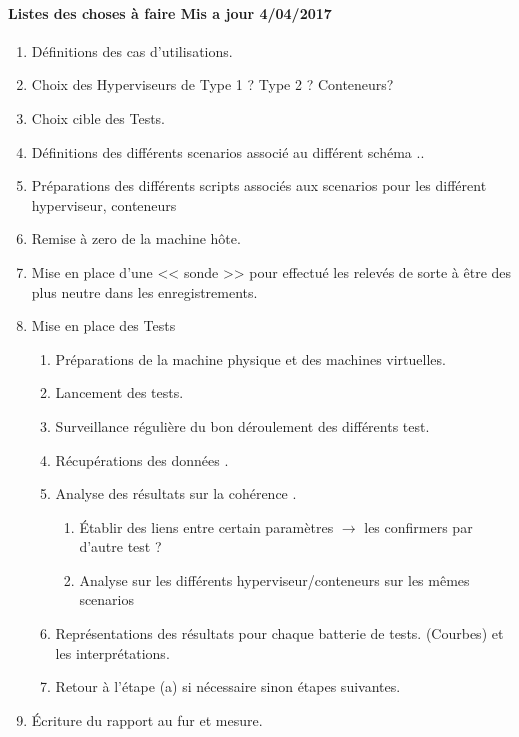 \documentclass[french]{article}
\begin{document}
\paragraph{Listes des choses à faire Mis a jour 4/04/2017}
\begin{enumerate}
	\item Définitions des cas d'utilisations. 
	\item Choix des Hyperviseurs de Type 1 ? Type 2 ? Conteneurs?
	\item Choix cible des Tests.
	\item Définitions des différents scenarios associé au différent schéma ..
	\item Préparations des différents scripts associés aux scenarios pour les différent hyperviseur, conteneurs 
	\item Remise à zero de la machine hôte.
	\item Mise en place d'une << sonde >> pour effectué les relevés de sorte à être des plus neutre dans les enregistrements.
	\item Mise en place des Tests 
		\begin{enumerate}
			\item Préparations de la machine physique et des machines virtuelles. 
			\item Lancement des tests.
			\item Surveillance régulière du bon déroulement des différents test.
			\item Récupérations des données . 
			\item Analyse des résultats sur la cohérence .
			\begin{enumerate}
				\item Établir des liens entre certain paramètres $\rightarrow $ les confirmers par d'autre test ? 
				\item Analyse sur les différents hyperviseur/conteneurs sur les mêmes scenarios 
			\end{enumerate}
			\item Représentations des résultats pour chaque batterie de tests. (Courbes) et les interprétations.
			\item Retour à l’étape (a) si nécessaire sinon étapes suivantes.
		\end{enumerate}
	\item Écriture du rapport au fur et mesure.	
			
\end{enumerate}
\end{document}
